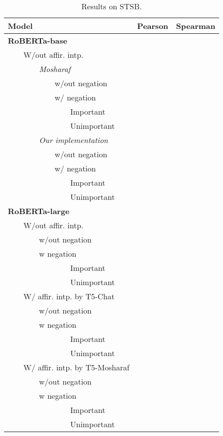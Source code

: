 \begin{table*}
\centering
\begin{tabular}{lrr}
\toprule
Model & Pearson & Spearman \\
\midrule
\textbf{RoBERTa-base} \\
~~~~W/out affir. intp. \\
~~~~~~~~\textit{Mosharaf} \\
~~~~~~~~~~~~w/out negation \\ 
~~~~~~~~~~~~w/ negation \\ 
~~~~~~~~~~~~~~~~Important \\ 
~~~~~~~~~~~~~~~~Unimportant \\ 
\midrule
~~~~~~~~\textit{Our implementation} \\
~~~~~~~~~~~~w/out negation \\
~~~~~~~~~~~~w/ negation \\ 
~~~~~~~~~~~~~~~~Important \\ 
~~~~~~~~~~~~~~~~Unimportant \\ 
\bottomrule
\textbf{RoBERTa-large} \\
~~~~W/out affir. intp. \\
~~~~~~~~w/out negation \\ 
~~~~~~~~w negation \\ 
~~~~~~~~~~~~~~~~Important \\ 
~~~~~~~~~~~~~~~~Unimportant \\ 
\midrule
~~~~W/ affir. intp. by T5-Chat \\
~~~~~~~~w/out negation \\ 
~~~~~~~~w negation \\ 
~~~~~~~~~~~~~~~~Important \\ 
~~~~~~~~~~~~~~~~Unimportant \\ 
\midrule
~~~~W/ affir. intp. by T5-Mosharaf \\
~~~~~~~~w/out negation \\ 
~~~~~~~~w negation \\ 
~~~~~~~~~~~~~~~~Important \\ 
~~~~~~~~~~~~~~~~Unimportant \\ 
\bottomrule
\end{tabular}
\caption{Results on STSB.}
\end{table*}